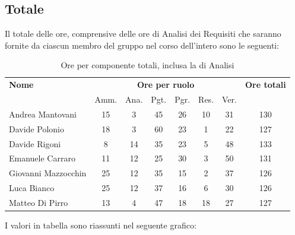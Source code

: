     
    
\pagebreak
\subsection{Totale}
Il totale delle ore, comprensive delle ore di Analisi dei Requisiti che saranno fornite da ciascun membro
del gruppo nel corso dell’intero  sono le seguenti:

\begin{table}[H]
\begin{tabular}{lccccccc}
\toprule
    \textbf{Nome}  & \multicolumn{6}{c}{\textbf{Ore per ruolo}} & \textbf{Ore totali} \\
     & Amm. & Ana. & Pgt. & Pgr. & Res. & Ver. & \\
    \midrule
   
	   Andrea Mantovani & 15 & 3 & 45 & 26 & 10 & 31 & 130 \\
	     Davide Polonio & 18 & 3 & 60 & 23 & 1 & 22 & 127 \\
	      Davide Rigoni & 8 & 14 & 35 & 23 & 5 & 48 & 133 \\
	   Emanuele Carraro & 11 & 12 & 25 & 30 & 3 & 50 & 131 \\
	Giovanni Mazzocchin & 25 & 12 & 35 & 15 & 2 & 37 & 126 \\ 
	        Luca Bianco & 25 & 12 & 37 & 16 & 6 & 30 & 126 \\ 
	    Matteo Di Pirro & 13 & 4 & 47 & 18 & 18 & 27 & 127 \\ 
   
    \bottomrule
\end{tabular}
\caption{Ore per componente totali, inclusa la  di Analisi}
\end{table}

I valori in tabella sono riassunti nel seguente grafico: \\ 

